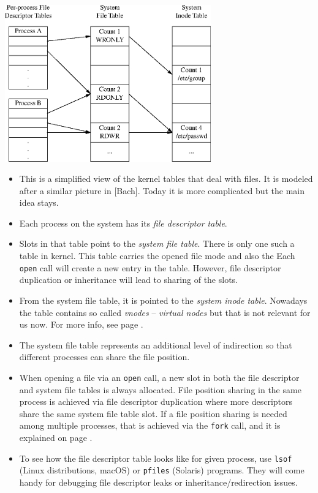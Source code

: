 
\begin{slide}
\begin{center}
%
\includegraphics[width=89mm]{img/eps/open_files1.eps}
\end{center}
\end{slide}


\begin{itemize}
\item This is a simplified view of the kernel tables that deal with files.  It
is modeled after a similar picture in [Bach].  Today it is more complicated but
the main idea stays.
\item Each process on the system has its \emph{file descriptor table}.
\item Slots in that table point to the \emph{system file table}.  There is
only one such a table in kernel.  This table carries the opened file mode and
also the  Each \texttt{open} call will create
a new entry in the table. However, file descriptor duplication or inheritance
will lead to sharing of the slots.
\item From the system file table, it is pointed to the \emph{system inode
table}.  Nowadays the table contains so called \emph{vnodes} -- \emph{virtual
nodes} but that is not relevant for us now. For more info,
see page \pageref{VFS}.
\item The system file table represents an additional level of indirection so
that different processes can share the file position.
\item When opening a file via an \texttt{open} call, a new slot in both the file
descriptor and system file tables is always allocated.  File position sharing in
the same process is achieved via file descriptor duplication where more
descriptors share the same system file table slot.  If a file position sharing
is needed among multiple processes, that is achieved via the \texttt{fork}
call, and it is explained on page \pageref{FDSHARING}.
\item To see how the file descriptor table looks like for given process,
use \texttt{lsof} (Linux distributions, macOS) or \texttt{pfiles} (Solaris)
programs. They will come handy for debugging file descriptor leaks or
inheritance/redirection issues.
\end{itemize}

